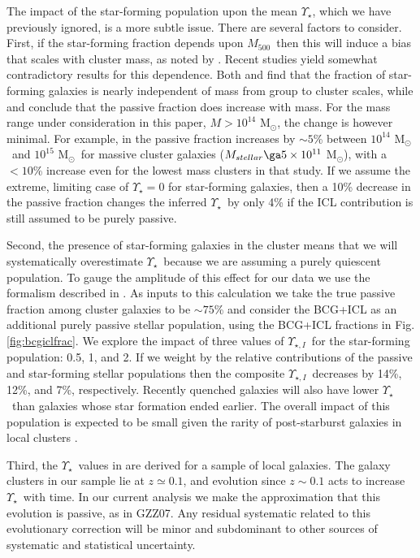 \documentclass[preprint]{emulateapj}
\newcommand{\msun}{M$_\odot$}
\newcommand\ptwo{GZZ07}
\newcommand\mfive{${M}_{500}$}
\newcommand{\mlrat}{$\Upsilon_\star$}
\newcommand{\mlrati}{$\Upsilon_{\star,I}$}
\begin{document}
The impact of the star-forming population upon the mean \mlrat, which we
have previously ignored, is a more subtle issue.  There are several
factors to consider. First, if the star-forming fraction depends upon
\mfive\ then this will induce a bias that scales with cluster mass, as
noted by \citet{leauthaud2012}. Recent studies yield somewhat
contradictory results for this dependence. Both \citet{finn2008} and
\cite{balogh2010} find that the fraction of star-forming galaxies is
nearly independent of mass from group to cluster scales, while
\citet{weinmann2006} and \citet{wetzel2012} conclude that the passive
fraction does increase with mass.  For the mass range under
consideration in this paper, $M>10^{14}$ \msun, the change is however
minimal.  For example, in \citet{wetzel2012} the passive fraction
increases by $\sim5$\% between $10^{14}$ \msun\ and $10^{15}$ \msun\
for massive cluster galaxies ($M_{stellar}\ga5\times10^{11}$ \msun),
with a $<10$\% increase even for the lowest mass clusters in that
study. If we assume the extreme, limiting case of \mlrat$=0$ for
star-forming galaxies, then a 10\% decrease in the passive fraction
changes the inferred \mlrat\ by only 4\% if the ICL contribution is
still assumed to be purely passive.


Second, the presence of star-forming galaxies in the cluster means
that we will systematically overestimate \mlrat\ because we are
assuming a purely quiescent population. To gauge the amplitude of
this effect for our data we use the formalism described in
\citet{lin2003}. As inputs to this calculation we take the true
passive fraction among cluster galaxies to be $\sim75$\%
\citep{balogh2010} and consider the BCG+ICL as an additional purely
passive stellar population, using the BCG+ICL fractions in
Fig. \ref{fig:bcgiclfrac}. We explore the impact of
three values of \mlrati\ for the star-forming population: 0.5, 1, and
2. If we weight by the relative contributions of the passive and
star-forming stellar populations then the composite \mlrati\ decreases
by 14\%, 12\%, and 7\%, respectively. Recently quenched
galaxies will also have lower \mlrat\ than galaxies whose star formation ended earlier.
The overall impact of this population is expected to be small given the rarity of
post-starburst galaxies in local clusters \citep[e. g.][]{couch2001,poggianti2004}.

Third, the \mlrat\ values in \citet{cappellari2006} are derived for a
sample of local galaxies. The galaxy clusters in our sample lie at
$z\simeq0.1$, and evolution since $z\sim0.1$ acts to increase \mlrat\
with time.  In our current analysis we make the approximation that
this evolution is passive, as in \ptwo. Any residual systematic
related to this evolutionary correction will be minor and subdominant
to other sources of systematic and statistical uncertainty.
\end{document}

